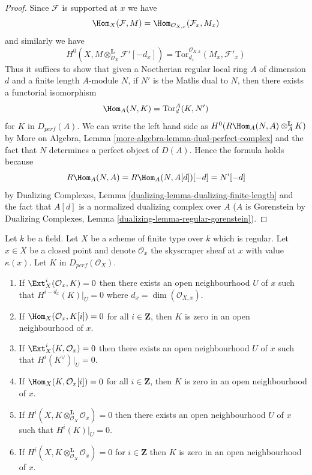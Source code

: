 \begin{proof}
Since $\mathcal{F}$ is supported at $x$ we have
$$
\Hom_X(\mathcal{F}, M) =
\Hom_{\mathcal{O}_{X, x}}(\mathcal{F}_x, M_x)
$$
and similarly we have
$$
H^0(X, M \otimes_{\mathcal{O}_X}^\mathbf{L} \mathcal{F}'[-d_x]) =
\text{Tor}^{\mathcal{O}_{X, x}}_{d_x}(M_x, \mathcal{F}'_x)
$$
Thus it suffices to show that given a Noetherian regular local ring $A$
of dimension $d$ and a finite length $A$-module $N$, if
$N'$ is the Matlis dual to $N$, then there exists a functorial isomorphism
$$
\Hom_A(N, K) = \text{Tor}^A_d(K, N')
$$
for $K$ in $D_{perf}(A)$. We can write the left hand side as
$H^0(R\Hom_A(N, A) \otimes_A^\mathbf{L} K)$ by
More on Algebra, Lemma \ref{more-algebra-lemma-dual-perfect-complex}
and the fact that $N$ determines a perfect object of $D(A)$.
Hence the formula holds because
$$
R\Hom_A(N, A) = R\Hom_A(N, A[d])[-d] = N'[-d]
$$
by Dualizing Complexes, Lemma \ref{dualizing-lemma-dualizing-finite-length}
and the fact that $A[d]$ is a normalized dualizing complex over $A$
($A$ is Gorenstein by
Dualizing Complexes, Lemma \ref{dualizing-lemma-regular-gorenstein}).
\end{proof}

\begin{lemma}
\label{lemma-orthogonal-point-sheaf}
Let $k$ be a field. Let $X$ be a scheme of finite type over $k$ which
is regular. Let $x \in X$ be a closed point and denote $\mathcal{O}_x$
the skyscraper sheaf at $x$ with value $\kappa(x)$. Let $K$ in
$D_{perf}(\mathcal{O}_X)$.
\begin{enumerate}
\item If $\Ext^i_X(\mathcal{O}_x, K) = 0$ then there exists an open
neighbourhood $U$ of $x$ such that $H^{i - d_x}(K)|_U = 0$ where
$d_x = \dim(\mathcal{O}_{X, x})$.
\item If $\Hom_X(\mathcal{O}_x, K[i]) = 0$ for all
$i \in \mathbf{Z}$, then $K$ is zero in an open neighbourhood of $x$.
\item If $\Ext^i_X(K, \mathcal{O}_x) = 0$ then there exists an open
neighbourhood $U$ of $x$ such that $H^i(K^\vee)|_U = 0$.
\item If $\Hom_X(K, \mathcal{O}_x[i]) = 0$ for all
$i \in \mathbf{Z}$, then $K$ is zero in an open neighbourhood of $x$.
\item If $H^i(X, K \otimes_{\mathcal{O}_X}^\mathbf{L} \mathcal{O}_x) = 0$
then there exists an open neighbourhood $U$ of $x$ such that
$H^i(K)|_U = 0$.
\item If $H^i(X, K \otimes_{\mathcal{O}_X}^\mathbf{L} \mathcal{O}_x) = 0$
for $i \in \mathbf{Z}$ then $K$ is zero in an
open neighbourhood of $x$.
\end{enumerate}
\end{lemma}

